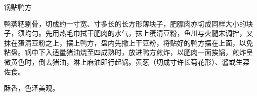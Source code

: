 \begin{recipe}{锅贴鸭方}

\ingredients


\cooking

鸭蒸粑剔骨，切成约一寸宽、寸多长的长方形薄块子，肥膘肉亦切成同样大小的块子，须均匀。先用热毛巾拭干肥肉的水气，抹上蛋清豆粉，鱼川与火腿末调拌，又抹在蛋清豆粉之上，摆上鸭方，盘内先撒上干豆粉，将贴好的鸭方摆在上面，以免粘盘。锅中下入适量猪油烧至四成熟时，放进鸭方煎炸，以肥肉一面挨锅，煎炸呈微黄色时，倒去猪油，淋上麻油即行起锅。黄葱（切成寸许长菊花形）、酱或生菜佐食。

\notes

酥香，色泽美观。

\end{recipe}

